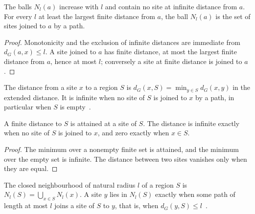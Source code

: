 \begin{lemma}
    \label{lem:dynamics_graph_ball}
    \leanok
    The balls $N_l(a)$ increase with $l$ and contain no site at infinite
    distance from $a$. For every $l$ at least the largest finite distance from
    $a$, the ball $N_l(a)$ is the set of sites joined to $a$ by a path.
\end{lemma}
\begin{proof}\leanok
    Monotonicity and the exclusion of infinite distances are immediate from
    $d_G(a,x)\leq l$. A site joined to $a$ has finite distance, at most the
    largest finite distance from $a$, hence at most $l$; conversely a site at
    finite distance is joined to $a$.
\end{proof}

\begin{definition}
    \label{def:dynamics_set_distance}
    \leanok
    The distance from a site $x$ to a region $S$ is
    $d_G(x,S)=\min_{y\in S}d_G(x,y)$ in the extended distance. It is infinite
    when no site of $S$ is joined to $x$ by a path, in particular when $S$ is
    empty~\cite{OpenAI2026AreaLaw}.
\end{definition}

\begin{lemma}
    \label{lem:dynamics_set_distance}
    \leanok
    A finite distance to $S$ is attained at a site of $S$. The distance is
    infinite exactly when no site of $S$ is joined to $x$, and zero exactly
    when $x\in S$.
\end{lemma}
\begin{proof}\leanok
    The minimum over a nonempty finite set is attained, and the minimum over
    the empty set is infinite. The distance between two sites vanishes only
    when they are equal.
\end{proof}

\begin{definition}
    \label{def:dynamics_graph_neighborhood}
    \leanok
    The closed neighbourhood of natural radius $l$ of a region $S$ is
    $N_l(S)=\bigcup_{x\in S}N_l(x)$. A site $y$ lies in $N_l(S)$ exactly when
    some path of length at most $l$ joins a site of $S$ to $y$, that is, when
    $d_G(y,S)\leq l$~\cite{OpenAI2026AreaLaw}.
\end{definition}

